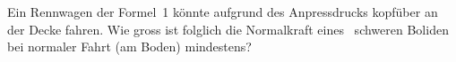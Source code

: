Ein Rennwagen der Formel~1 könnte aufgrund des Anpressdrucks kopfüber an der Decke fahren. Wie gross ist folglich die Normalkraft eines \mFeO\ schweren Boliden bei normaler Fahrt (am Boden) mindestens?
